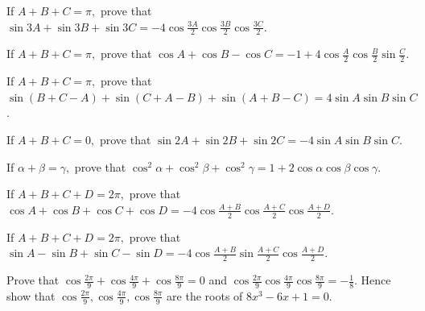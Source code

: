 \item If $A + B + C = \pi,$ prove that $\sin 3A + \sin 3B + \sin 3C = -4\cos\frac{3A}{2}\cos\frac{3B}{2}\cos\frac{3C}{2}$.

\item If $A + B + C = \pi,$ prove that $\cos A + \cos B - \cos C = -1 + 4\cos\frac{A}{2}\cos\frac{B}{2}\sin\frac{C}{2}$.

\item If $A + B + C = \pi,$ prove that $\sin(B + C - A) + \sin(C + A - B) + \sin(A + B - C) = 4\sin A\sin B\sin C$.

\item If $A + B + C = 0,$ prove that $\sin 2A + \sin 2B + \sin 2C = -4\sin A\sin B\sin C$.

\item If $\alpha + \beta = \gamma,$ prove that $\cos^2\alpha + \cos^2\beta + \cos^2\gamma = 1 + 2\cos\alpha\cos\beta\cos\gamma$.

\item If $A + B + C + D = 2\pi,$ prove that $\cos A + \cos B + \cos C + \cos D = -4\cos\frac{A + B}{2}\cos\frac{A +
    C}{2}\cos\frac{A + D}{2}$.

\item If $A + B + C + D = 2\pi,$ prove that $\sin A - \sin B + \sin C - \sin D = -4\cos\frac{A + B}{2}\sin\frac{A +
    C}{2}\cos\frac{A + D}{2}$.

\item Prove that $\cos\frac{2\pi}{9} + \cos\frac{4\pi}{9} + \cos\frac{8\pi}{9} = 0$ and $\cos\frac{2\pi}{9}\cos\frac{4\pi}{9}
    \cos\frac{8\pi}{9} = -\frac{1}{8}$. Hence show that $\cos\frac{2\pi}{9}, \cos\frac{4\pi}{9}, \cos\frac{8\pi}{9}$ are the
    roots of $8x^3 - 6x + 1 = 0$.
\stopitemize
